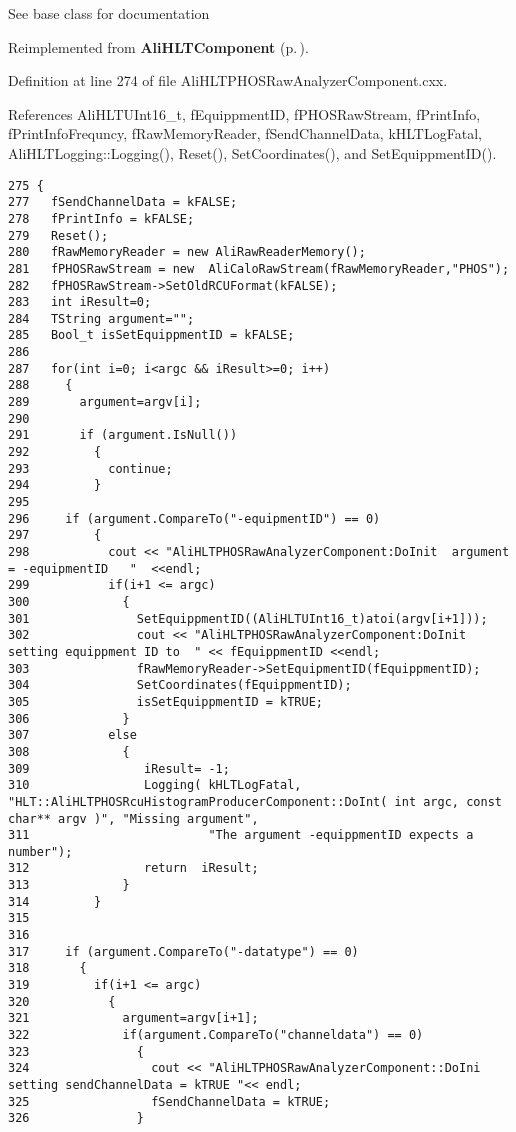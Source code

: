 See base class for documentation 

Reimplemented from {\bf Ali\-HLTComponent} {\rm (p.\,\pageref{classAliHLTComponent_b5})}.

Definition at line 274 of file Ali\-HLTPHOSRaw\-Analyzer\-Component.cxx.

References Ali\-HLTUInt16\_\-t, f\-Equippment\-ID, f\-PHOSRaw\-Stream, f\-Print\-Info, f\-Print\-Info\-Frequncy, f\-Raw\-Memory\-Reader, f\-Send\-Channel\-Data, k\-HLTLog\-Fatal, Ali\-HLTLogging::Logging(), Reset(), Set\-Coordinates(), and Set\-Equippment\-ID().

\footnotesize\begin{verbatim}275 {
277   fSendChannelData = kFALSE;
278   fPrintInfo = kFALSE;
279   Reset();
280   fRawMemoryReader = new AliRawReaderMemory();
281   fPHOSRawStream = new  AliCaloRawStream(fRawMemoryReader,"PHOS");
282   fPHOSRawStream->SetOldRCUFormat(kFALSE);
283   int iResult=0;
284   TString argument="";
285   Bool_t isSetEquippmentID = kFALSE;
286 
287   for(int i=0; i<argc && iResult>=0; i++) 
288     {
289       argument=argv[i];
290       
291       if (argument.IsNull()) 
292         {
293           continue;
294         }
295                          
296     if (argument.CompareTo("-equipmentID") == 0) 
297         {
298           cout << "AliHLTPHOSRawAnalyzerComponent:DoInit  argument = -equipmentID   "  <<endl;  
299           if(i+1 <= argc)
300             {
301               SetEquippmentID((AliHLTUInt16_t)atoi(argv[i+1]));
302               cout << "AliHLTPHOSRawAnalyzerComponent:DoInit  setting equippment ID to  " << fEquippmentID <<endl;
303               fRawMemoryReader->SetEquipmentID(fEquippmentID); 
304               SetCoordinates(fEquippmentID);
305               isSetEquippmentID = kTRUE;
306             }
307           else
308             {
309                iResult= -1;
310                Logging( kHLTLogFatal, "HLT::AliHLTPHOSRcuHistogramProducerComponent::DoInt( int argc, const char** argv )", "Missing argument",
311                         "The argument -equippmentID expects a number");
312                return  iResult;   
313             }
314         }
315       
316     
317     if (argument.CompareTo("-datatype") == 0) 
318       {
319         if(i+1 <= argc)
320           {
321             argument=argv[i+1];
322             if(argument.CompareTo("channeldata") == 0)
323               {
324                 cout << "AliHLTPHOSRawAnalyzerComponent::DoIni  setting sendChannelData = kTRUE "<< endl; 
325                 fSendChannelData = kTRUE;
326               }

\end{verbatim}
